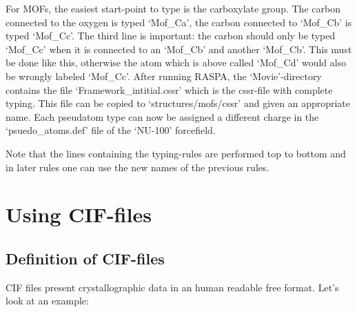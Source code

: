 For MOFs, the easiest start-point to type is the carboxylate group. The carbon connected to the oxygen is typed `Mof\_Ca', the carbon
connected to `Mof\_Cb' is typed `Mof\_Cc'. The third line is important: the carbon should only be typed `Mof\_Cc' when it is connected
to an `Mof\_Cb' and another `Mof\_Cb'. This must be done like this, otherwise the atom which is above called `Mof\_Cd' would also
be wrongly labeled `Mof\_Cc'. After running RASPA, the `Movie'-directory contains the file `Framework\_intitial.cssr' which is the
cssr-file with complete typing. This file can be copied to `structures/mofs/cssr' and given an appropriate name.
Each pseudatom type can now be assigned a different charge in the `psuedo\_atoms.def' file of the 
`NU-100' forcefield.

Note that the lines containing the typing-rules  are performed top to bottom and in later rules one can use the new names of the previous rules.


\section{Using CIF-files}

\subsection{Definition of CIF-files}

CIF files present crystallographic data in an human readable free format. Let's look at an example:

